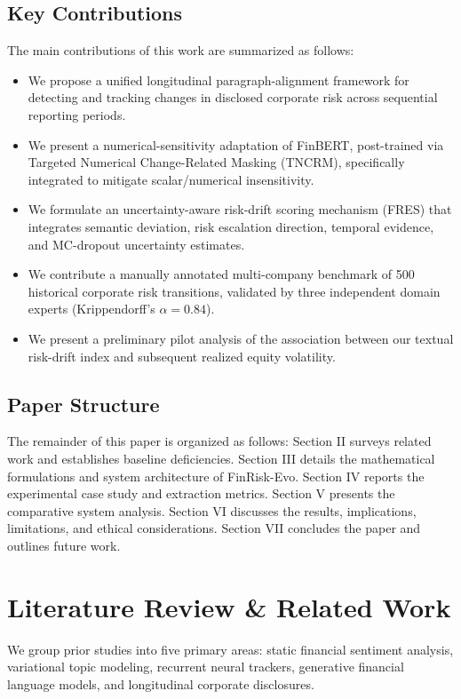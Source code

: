 \documentclass[journal]{IEEEtran}
\begin{document}
\subsection{Key Contributions}
The main contributions of this work are summarized as follows:
\begin{itemize}
    \item We propose a unified longitudinal paragraph-alignment framework for detecting and tracking changes in disclosed corporate risk across sequential reporting periods.
    \item We present a numerical-sensitivity adaptation of FinBERT, post-trained via Targeted Numerical Change-Related Masking (TNCRM), specifically integrated to mitigate scalar/numerical insensitivity.
    \item We formulate an uncertainty-aware risk-drift scoring mechanism (FRES) that integrates semantic deviation, risk escalation direction, temporal evidence, and MC-dropout uncertainty estimates.
    \item We contribute a manually annotated multi-company benchmark of 500 historical corporate risk transitions, validated by three independent domain experts (Krippendorff's $\alpha = 0.84$).
    \item We present a preliminary pilot analysis of the association between our textual risk-drift index and subsequent realized equity volatility.
\end{itemize}

\subsection{Paper Structure}
The remainder of this paper is organized as follows: Section II surveys related work and establishes baseline deficiencies. Section III details the mathematical formulations and system architecture of FinRisk-Evo. Section IV reports the experimental case study and extraction metrics. Section V presents the comparative system analysis. Section VI discusses the results, implications, limitations, and ethical considerations. Section VII concludes the paper and outlines future work.

\section{Literature Review \& Related Work}

We group prior studies into five primary areas: static financial sentiment analysis, variational topic modeling, recurrent neural trackers, generative financial language models, and longitudinal corporate disclosures.
\end{document}
